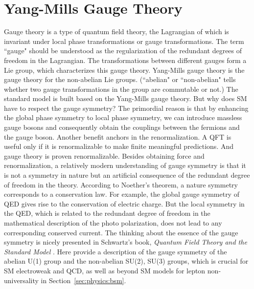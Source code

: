 








\section{Yang-Mills Gauge Theory}
\label{sec:physics:qft:gaugeSymmetry}

Gauge theory is a type of quantum field theory, the Lagrangian of which is invariant under local phase transformations or gauge transformations. The term ``gauge" should be understood as the regularization of the redundant degrees of freedom in the Lagrangian. The transformations between different gauges form a Lie group, which characterizes this gauge theory. Yang-Mills gauge theory is the gauge theory for the non-abelian Lie groups. (``abelian" or ``non-abelian" tells whether two gauge transformations in the group are commutable or not.) The standard model is built based on the Yang-Mills gauge theory. But why does SM have to respect the gauge symmetry? The primordial reason is that by enhancing the global phase symmetry to local phase symmetry, we can introduce massless gauge bosons and consequently obtain the couplings between the fermions and the gauge boson. Another benefit anchors in the renormalization. A QFT is useful only if it is renormalizable to make finite meaningful predictions. And gauge theory is proven renormalizable. Besides obtaining force and renormalization, a relatively modern understanding of gauge symmetry is that it is not a symmetry in nature but an artificial consequence of the redundant degree of freedom in the theory. According to Noether's theorem, a nature symmetry corresponds to a conservation law. For example, the global gauge symmetry of QED gives rise to the conservation of electric charge. But the local symmetry in the QED, which is related to the redundant degree of freedom in the mathematical description of the photo polarization, does not lead to any corresponding conserved current. The thinking about the essence of the gauge symmetry is nicely presented in Schwartz's book, \textit{Quantum Field Theory and the Standard Model} \cite{schwartz2014quantum}. Here provide a description of the gauge symmetry of the abelian U(1) group and the non-abelian SU(2), SU(3) groups, which is crucial for SM electroweak and QCD, as well as beyond SM models for lepton non-universality in Section~\ref{sec:physics:bsm}.


